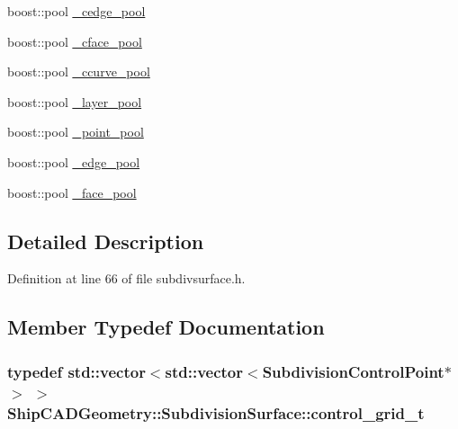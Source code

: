 \begin{DoxyCompactItemize}
\item 
boost\-::pool \hyperlink{classShipCADGeometry_1_1SubdivisionSurface_ab66fbf875487bf60e8bfee2467ec62b0}{\-\_\-cedge\-\_\-pool}
\item 
boost\-::pool \hyperlink{classShipCADGeometry_1_1SubdivisionSurface_a4adedb7d11b2317d0ce08c650dd2f2cf}{\-\_\-cface\-\_\-pool}
\item 
boost\-::pool \hyperlink{classShipCADGeometry_1_1SubdivisionSurface_a832b507f17ba2220df2edfbb342e9f40}{\-\_\-ccurve\-\_\-pool}
\item 
boost\-::pool \hyperlink{classShipCADGeometry_1_1SubdivisionSurface_a3882857500f96a20d54bb484860186eb}{\-\_\-layer\-\_\-pool}
\item 
boost\-::pool \hyperlink{classShipCADGeometry_1_1SubdivisionSurface_a51b9089fd519e72564103a7b69ae7712}{\-\_\-point\-\_\-pool}
\item 
boost\-::pool \hyperlink{classShipCADGeometry_1_1SubdivisionSurface_a64367dcb560b1160baedd242fad08d5c}{\-\_\-edge\-\_\-pool}
\item 
boost\-::pool \hyperlink{classShipCADGeometry_1_1SubdivisionSurface_a66ebffe9b49fbdc29df0f3747affb786}{\-\_\-face\-\_\-pool}
\end{DoxyCompactItemize}


\subsection{Detailed Description}


Definition at line 66 of file subdivsurface.\-h.



\subsection{Member Typedef Documentation}
\hypertarget{classShipCADGeometry_1_1SubdivisionSurface_a515bffd2b65080a2c7f07ce98f82b026}{
\subsubsection[{control\-\_\-grid\-\_\-t}]{\setlength{\rightskip}{0pt plus 5cm}typedef std\-::vector$<$std\-::vector$<${\bf Subdivision\-Control\-Point}$\ast$$>$ $>$ {\bf Ship\-C\-A\-D\-Geometry\-::\-Subdivision\-Surface\-::control\-\_\-grid\-\_\-t}}}\label{classShipCADGeometry_1_1SubdivisionSurface_a515bffd2b65080a2c7f07ce98f82b026}


